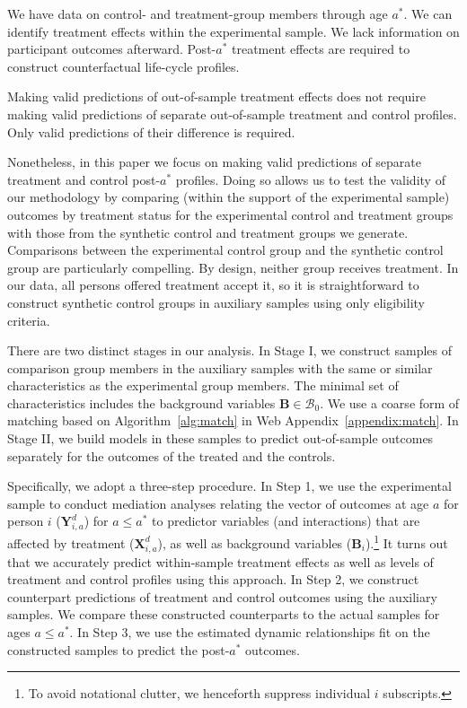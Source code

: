 We have data on control- and treatment-group members through age $a^{\ast}$. We can identify treatment effects within the experimental sample. We lack information on participant outcomes afterward. Post-$a^{\ast}$ treatment effects are required to construct counterfactual life-cycle profiles.

Making valid predictions of out-of-sample treatment effects does not require making valid predictions of separate out-of-sample treatment and control profiles. Only valid predictions of their difference is required.

Nonetheless, in this paper we focus on making valid predictions of separate treatment and control post-$a^*$ profiles. Doing so allows us to test the validity of our methodology by comparing (within the support of the experimental sample) outcomes by treatment status for the experimental control and treatment groups with those from the synthetic control and treatment groups we generate. Comparisons between the experimental control group and the synthetic control group are particularly compelling. By design, neither group receives treatment. In our data, all persons offered treatment accept it, so it is straightforward to construct synthetic control groups in auxiliary samples using only eligibility criteria.

There are two distinct stages in our analysis. In Stage I, we construct samples of comparison group members in the auxiliary samples with the same or similar characteristics as the experimental group members. The minimal set of characteristics includes the background variables $\bm{B} \in \mathcal{B}_0$. We use a coarse form of matching based on Algorithm~\ref{alg:match} in Web Appendix~\ref{appendix:match}. In Stage II, we build models in these samples to predict out-of-sample outcomes separately for the outcomes of the treated and the controls.

Specifically, we adopt a three-step procedure. In Step 1, we use the experimental sample to conduct mediation analyses relating the vector of outcomes at age $a$ for person $i$ ($\bm{Y}^{d}_{i,a}$) for $a\leq a^*$ to predictor variables (and interactions) that are affected by treatment ($\bm{X}^{d}_{i,a}$), as well as background variables ($\bm{B}_i$).\footnote{To avoid notational clutter, we henceforth suppress individual $i$ subscripts.} It turns out that we accurately predict within-sample treatment effects as well as levels of treatment and control profiles using this approach. In Step 2, we construct counterpart predictions of treatment and control outcomes using the auxiliary samples. We compare these constructed counterparts to the actual samples for ages $a \leq a^\ast$. In Step 3, we use the estimated dynamic relationships fit on the constructed samples to predict the post-$a^{\ast}$ outcomes.

